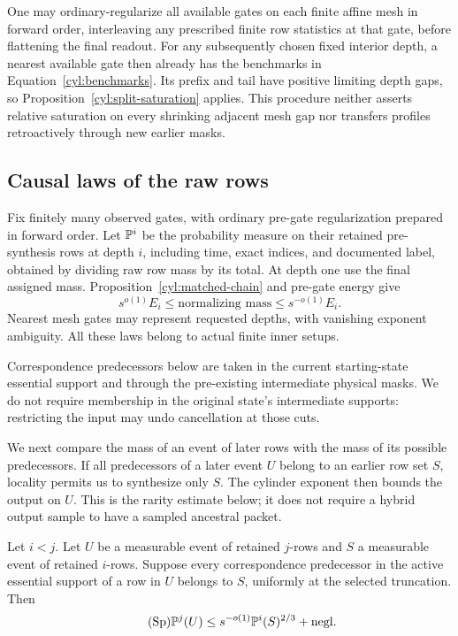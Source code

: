 \begin{remark}\label{cyl:forward-preparation}
One may ordinary-regularize all available gates on each finite affine
mesh in forward order, interleaving any prescribed finite row statistics
at that gate, before flattening the final readout.  For any subsequently
chosen fixed interior depth, a nearest available gate then already has
the benchmarks in Equation~\eqref{cyl:benchmarks}.  Its prefix and tail
have positive limiting depth gaps, so
Proposition~\ref{cyl:split-saturation} applies.  This procedure neither
asserts relative saturation on every shrinking adjacent mesh gap nor
transfers profiles retroactively through new earlier masks.
\end{remark}

\subsection{Causal laws of the raw rows}

Fix finitely many observed gates, with ordinary pre-gate regularization
prepared in forward order. Let $\mathbb P^i$ be the probability measure
on their retained pre-synthesis rows at depth $i$, including time, exact
indices, and documented label, obtained by dividing raw row mass by its
total. At depth one use the final assigned mass.
Proposition~\ref{cyl:matched-chain} and pre-gate energy give
\begin{equation}\label{cyl:law-normalization}
 s^{o(1)}E_i\le\text{normalizing mass}\le s^{-o(1)}E_i.
\end{equation}
Nearest mesh gates may represent requested depths, with vanishing
exponent ambiguity. All these laws belong to actual finite inner setups.

Correspondence predecessors below are taken in the current starting-state
essential support and through the pre-existing intermediate physical
masks. We do not require membership in the original state's intermediate
supports: restricting the input may undo cancellation at those cuts.

We next compare the mass of an event of later rows with the mass of its
possible predecessors. If all predecessors of a later event $U$ belong
to an earlier row set $S$, locality permits us to synthesize only $S$.
The cylinder exponent then bounds the output on $U$. This is the rarity
estimate below; it does not require a hybrid output sample to have a
sampled ancestral packet.

\begin{lemma}\label{cyl:rarity}
Let $i<j$. Let $U$ be a measurable event of retained $j$-rows and
$S$ a measurable event of retained $i$-rows. Suppose every correspondence
predecessor in the active essential support of a row in $U$ belongs
to $S$, uniformly at the selected truncation. Then
\begin{equation}\tag{Sp}\label{eq:Sp}
 \mathbb P^j(U)\le s^{-o(1)}\mathbb P^i(S)^{2/3}+\mathrm{negl}.
\end{equation}
\end{lemma}

